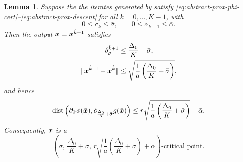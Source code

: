 \documentclass[english]{article}
\newtheorem{lemma}{Lemma}[section]
\begin{document}
\begin{lemma}
\label{lem:abstract-prox-certificate-bound}
Suppose the the iterates generated by
 satisfy
\eqref{eq:abstract-prox-phi-cert}--\eqref{eq:abstract-prox-descent} for
all $k=0,\ldots,K-1$, with
\[
    0\le\sigma_k\le\bar\sigma,
    \qquad
    0\le\alpha_{k+1}\le\bar\alpha .
\]
Then the output $\bar{\bm{x}}=\bm{x}^{\hat k+1}$ satisfies
\begin{align}
    \delta_g^{\hat k+1}
    &\le
    \frac{\Delta_0}{K}+\bar\sigma,
    \label{eq:abstract-prox-deltag-bound}
    \\
    \|\bm{x}^{\hat k+1}-\bm{x}^{\hat k}\|
    &\le
    \sqrt{
        \frac{1}{a}
        \left(
            \frac{\Delta_0}{K}+\bar\sigma
        \right)
    },
    \label{eq:abstract-prox-step-bound}
\end{align}
and hence
\begin{equation}
    \operatorname{dist}
    \left(
        \partial_{\bar\sigma}\phi(\bar{\bm{x}}),
        \partial_{\frac{\Delta_0}{K}+\bar\sigma}g(\bar{\bm{x}})
    \right)
    \le
    r
    \sqrt{
        \frac{1}{a}
        \left(
            \frac{\Delta_0}{K}+\bar\sigma
        \right)
    }
    +\bar\alpha .
    \label{eq:abstract-prox-critical-bound}
\end{equation}
Consequently, $\bar{\bm{x}}$ is a
\[
    \left(
        \bar\sigma,\,
        \frac{\Delta_0}{K}+\bar\sigma,\,
        r
        \sqrt{
            \frac{1}{a}
            \left(
                \frac{\Delta_0}{K}+\bar\sigma
            \right)
        }
        +\bar\alpha
    \right)\text{-critical point}.
\]
\end{lemma}
\end{document}
